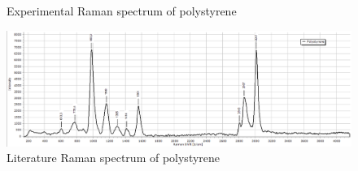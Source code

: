     \begin{figure}[h]
        \centering
        \caption{Experimental Raman spectrum of polystyrene}
        \label{fig:ps_x}
    \end{figure}

    \begin{figure}[h]
        \centering
        \includegraphics[width=\textwidth]{images/lit_raman/PS.png}
        \caption{Literature Raman spectrum of polystyrene \cite{spectrap}}
        \label{fig:ps_l}
    \end{figure}
